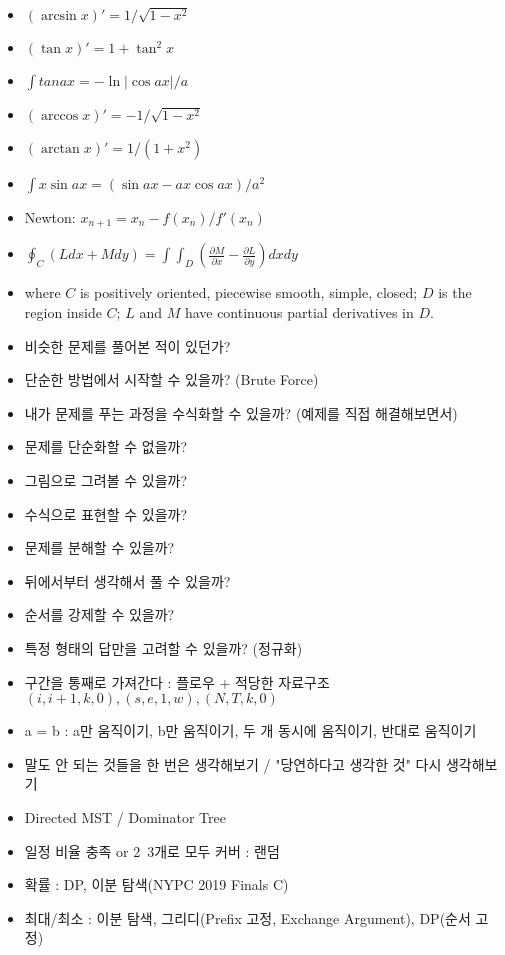 \documentclass[landscape, 8pt, a4paper, oneside]{extarticle} %
\begin{document}
\begin{multicols*}{3}
\begin{itemize}
    \setlength\itemsep{0.1em}
    \item $(\arcsin x)'=1/\sqrt{1-x^2}$
    \item $(\tan x)'=1+\tan^2 x$
    \item $\int tan ax=-\ln |\cos ax|/a$
    \item $(\arccos x)'=-1/\sqrt{1-x^2}$
    \item $(\arctan x)'=1/(1+x^2)$
    \item $\int x \sin ax=(\sin ax - ax\cos ax)/a^2$
    \item Newton: $x_{n+1}=x_{n}-f(x_n)/f'(x_n)$
    \item $\oint_C (Ldx+Mdy)=\int\int_D (\frac{\partial M}{\partial x}-\frac{\partial L}{\partial y})dxdy$
    \item where $C$ is positively oriented, piecewise smooth, simple, closed; $D$ is the region inside $C$; $L$ and $M$ have continuous partial derivatives in $D$.
\end{itemize}

\begin{itemize}
    \setlength\itemsep{0.1em}
    \item 비슷한 문제를 풀어본 적이 있던가?
    \item 단순한 방법에서 시작할 수 있을까? (Brute Force)
    \item 내가 문제를 푸는 과정을 수식화할 수 있을까? (예제를 직접 해결해보면서)
    \item 문제를 단순화할 수 없을까?
    \item 그림으로 그려볼 수 있을까?
    \item 수식으로 표현할 수 있을까?
    \item 문제를 분해할 수 있을까?
    \item 뒤에서부터 생각해서 풀 수 있을까?
    \item 순서를 강제할 수 있을까?
    \item 특정 형태의 답만을 고려할 수 있을까? (정규화)
    \item 구간을 통째로 가져간다 : 플로우 + 적당한 자료구조 $(i,i+1,k,0),(s,e,1,w),(N,T,k,0)$
    \item a = b : a만 움직이기, b만 움직이기, 두 개 동시에 움직이기, 반대로 움직이기
    \item 말도 안 되는 것들을 한 번은 생각해보기 / "당연하다고 생각한 것" 다시 생각해보기
    \item Directed MST / Dominator Tree
    \item 일정 비율 충족 or 2~3개로 모두 커버 : 랜덤
    \item 확률 : DP, 이분 탐색(NYPC 2019 Finals C)
    \item 최대/최소 : 이분 탐색, 그리디(Prefix 고정, Exchange Argument), DP(순서 고정)
\end{itemize}

\end{multicols*}
\end{document}
